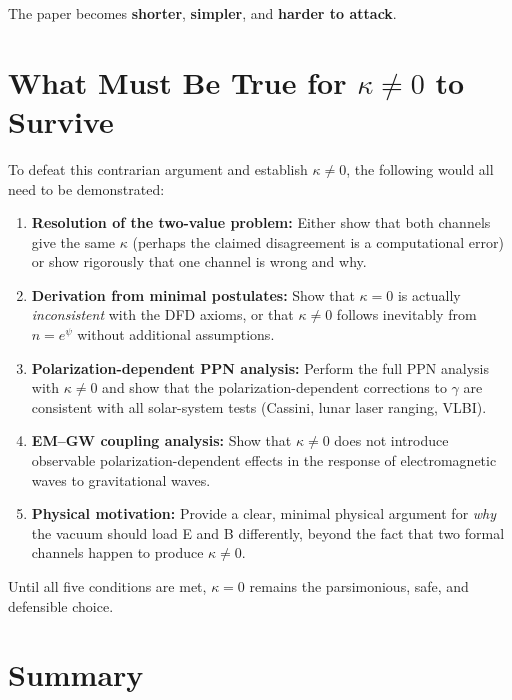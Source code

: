\documentclass[12pt,a4paper]{article}
\theoremstyle{definition}
\theoremstyle{remark}
\begin{document}
The paper becomes \textbf{shorter}, \textbf{simpler}, and
\textbf{harder to attack}.

\section{What Must Be True for $\kappa \neq 0$ to Survive}
\label{sec:survival-conditions}

To defeat this contrarian argument and establish $\kappa \neq 0$, the
following would all need to be demonstrated:

\begin{enumerate}
\item \textbf{Resolution of the two-value problem:} Either show that
  both channels give the same $\kappa$ (perhaps the claimed disagreement
  is a computational error) or show rigorously that one channel is
  wrong and why.

\item \textbf{Derivation from minimal postulates:} Show that $\kappa = 0$
  is actually \emph{inconsistent} with the DFD axioms, or that
  $\kappa \neq 0$ follows inevitably from $n = e^\psi$ without
  additional assumptions.

\item \textbf{Polarization-dependent PPN analysis:} Perform the
  full PPN analysis with $\kappa \neq 0$ and show that the
  polarization-dependent corrections to $\gamma$ are consistent with
  all solar-system tests (Cassini, lunar laser ranging, VLBI).

\item \textbf{EM--GW coupling analysis:} Show that $\kappa \neq 0$ does
  not introduce observable polarization-dependent effects in the
  response of electromagnetic waves to gravitational waves.

\item \textbf{Physical motivation:} Provide a clear, minimal physical
  argument for \emph{why} the vacuum should load E and B differently,
  beyond the fact that two formal channels happen to produce $\kappa \neq 0$.
\end{enumerate}

Until all five conditions are met, $\kappa = 0$ remains the
parsimonious, safe, and defensible choice.

\section{Summary}
\label{sec:summary}
\end{document}
